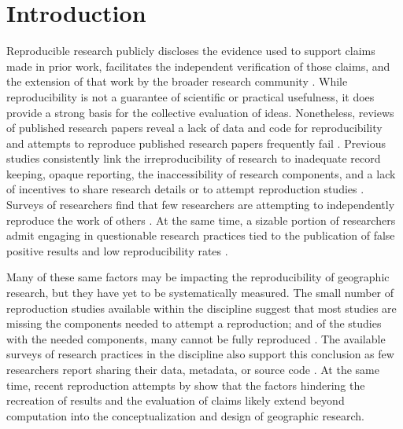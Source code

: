 \documentclass[]{interact}
\theoremstyle{plain}%
\theoremstyle{definition}
\theoremstyle{remark}
\begin{document}
\newpage
\section*{Introduction}
Reproducible research publicly discloses the evidence used to support claims made in prior work, facilitates the independent verification of those claims, and the extension of that work by the broader research community \citep{earp2015, nosek2012scientific, Schmidt2009}.
While reproducibility is not a guarantee of scientific or practical usefulness, it does provide a strong basis for the collective evaluation of ideas.
Nonetheless, reviews of published research papers reveal a lack of data and code for reproducibility \citep{moraila2014measuring, iqbal2016reproducible} and attempts to reproduce published research papers frequently fail \citep[see][]{raghupathi2022reproducibility, chang2015economics}.
Previous studies consistently link the irreproducibility of research to inadequate record keeping, opaque reporting, the inaccessibility of research components, and a lack of incentives to share research details or to attempt reproduction studies \citep{ranstam2000fraud, anderson2007normative, NASEM2019}.
Surveys of researchers find that few researchers are attempting to independently reproduce the work of others \citep{baker20161, boulbes2018survey}.
At the same time, a sizable portion of researchers admit engaging in questionable research practices tied to the publication of false positive results and low reproducibility rates \citep{fanelli2009many, fraser2018questionable}.

Many of these same factors may be impacting the reproducibility of geographic research, but they have yet to be systematically measured.
The small number of reproduction studies available within the discipline suggest that most studies are missing the components needed to attempt a reproduction; and of the studies with the needed components, many cannot be fully reproduced \citep[see][]{Kedron2022dimaggio, konkol2019, Nust-AGILE_2018, Nust_AGILE_2020, Nust_AGILE_2021, Nust_AGILE_2022, ostermann2021, paez2022reproducibility}.
The available surveys of research practices in the discipline also support this conclusion as few researchers report sharing their data, metadata, or source code \citep{balz2020reproducibility, konkol2019, ostermann2017}.
At the same time, recent reproduction attempts by \citet{Kedron_MollaloRP, Kedron_SaffaryRP, Kedron_VijayanRP} show that the factors hindering the recreation of results and the evaluation of claims likely extend beyond computation into the conceptualization and design of geographic research.
\end{document}
